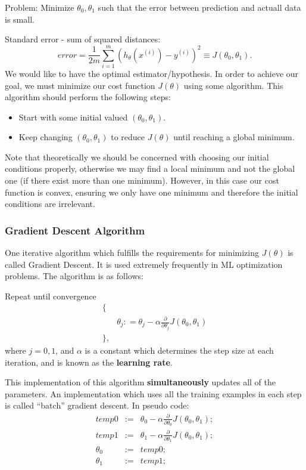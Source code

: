 \documentclass[12pt] {article}
\newcommand{\nn}{\nonumber}
\newcommand{\ind}{{(i)}}
\begin{document}
Problem: Minimize $\theta_0, \theta_1$ such that the error between prediction and actuall data is small.

Standard error - sum of squared distances:
\begin{equation}
  error = \frac{1}{2m} \sum_{i=1}^{m} \left( h_\theta (x^\ind) - y^\ind  \right)^2 \equiv J(\theta_0, \theta_1). 
\end{equation}
We would like to have the optimal estimator/hypothesis. In order to achieve our goal, we must minimize our cost function $J(\theta)$ using some algorithm. This algorithm should perform the following steps: 
\begin{itemize}
   \item Start with some initial valued $(\theta_0,\theta_1)$.
   \item Keep changing $(\theta_0,\theta_1)$ to reduce $J(\theta)$ until reaching a global minimum.
 \end{itemize} 
 Note that theoretically we should be concerned with choosing our initial conditions properly, otherwise we may find a local minimum and not the global one (if there exist more than one minimum). However, in this case our cost function is convex, ensuring we only have one minimum and therefore the initial conditions are irrelevant.

  \subsubsection{Gradient Descent Algorithm}

    One iterative algorithm which fulfills the requirements for minimizing $J(\theta)$ is called Gradient Descent. It is used extremely frequently in ML optimization problems.
    The algorithm is as follows:

    Repeat until convergence
    \begin{eqnarray}
      \{ \nn \\ \nn
        &\theta_j: \nn
        = \theta_j - \alpha \frac{\partial}{\partial \theta_j} J(\theta_0,\theta_1) \\ \nn
      \} \nn, 
    \end{eqnarray}
    where $j=0,1$, and $\alpha$ is a constant which determines the step size at each iteration, and is known as the {\bf learning rate}.

    This implementation of this algorithm {\bf simultaneously} updates all of the parameters.
    An implementation which uses all the training examples in each step is called ``batch'' gradient descent. In pseudo code:
    \begin{eqnarray}
      temp0 &:=& \theta_0 - \alpha \frac{\partial}{\partial \theta_0} J(\theta_0,\theta_1) ; \nn \\
      temp1 &:=& \theta_1 - \alpha \frac{\partial}{\partial \theta_1} J(\theta_0,\theta_1) ; \nn \\
      \theta_0 &:=& temp0 ; \nn \\
      \theta_1 &:=& temp1 ; \nn 
    \end{eqnarray}
    
\end{document}
